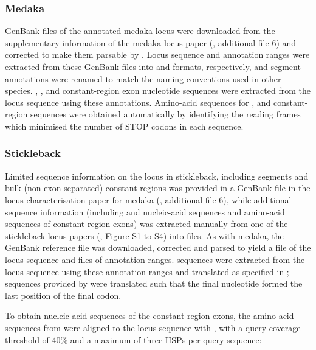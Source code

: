 \subsubsection{Medaka}
\label{sec:ref_locus_ola}

GenBank files of the annotated medaka \igh{} locus were downloaded from the supplementary information of the medaka locus paper (\parencite{magadan2011medaka}, additional file 6) and corrected to make them parsable by . Locus sequence and annotation ranges were extracted from these GenBank files into  and  formats, respectively, and segment annotations were renamed to match the naming conventions used in other species. \vh, \dh, \jh and constant-region exon nucleotide sequences were extracted from the locus sequence using these annotations. Amino-acid sequences for \vh, \jh and constant-region sequences were obtained automatically by identifying the reading frames which minimised the number of STOP codons in each sequence.

\subsubsection{Stickleback}
\label{sec:ref_locus_gac}

Limited sequence information on the \igh{} locus in stickleback, including \vh segments and bulk (non-exon-separated) constant regions was provided in a GenBank file in the locus characterisation paper for medaka (\parencite{magadan2011medaka}, additional file 6), while additional sequence information (including \dh and \jh nucleic-acid sequences and amino-acid sequences of constant-region exons) was extracted manually from one of the stickleback locus papers (\parencite{bao2010stickleback},  Figure S1 to S4) into  files. As with medaka, the GenBank reference file was downloaded, corrected and parsed to yield a  file of the locus sequence and  files of annotation ranges. \vh sequences were extracted from the locus sequence using these annotation ranges and translated as specified in ; \jh sequences provided by \parencite{bao2010stickleback} were translated such that the final nucleotide formed the last position of the final codon.

To obtain nucleic-acid sequences of the constant-region exons, the amino-acid sequences from \parencite{bao2010stickleback} were aligned to the locus sequence with  \parencite{gertz2006tblastn}, with a query coverage threshold of 40\% and a maximum of three HSPs per query sequence:

